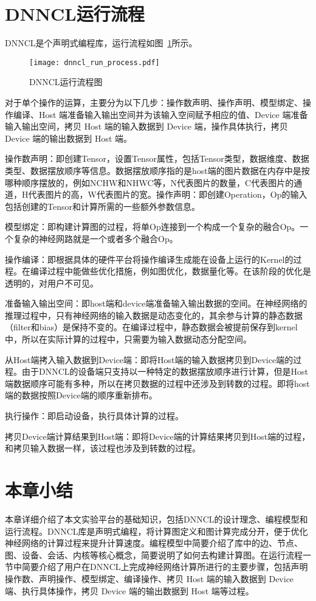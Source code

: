 \section{DNNCL运行流程}
DNNCL是个声明式编程库，运行流程如图~\ref{fig:dnncl-run-process}所示。

\begin{figure}[htb]
  \centering
  \texttt{[image: dnncl\_run\_process.pdf]}
  \caption{DNNCL运行流程图}
  \label{fig:dnncl-run-process}
\end{figure}

对于单个操作的运算，主要分为以下几步：操作数声明、操作声明、模型绑定、操作编译、Host 端准备输入输出空间并为该输入空间赋予相应的值、Device 端准备输入输出空间，拷贝 Host 端的输入数据到 Device 端，操作具体执行，拷贝 Device 端的输出数据到 Host 端。

操作数声明：即创建Tensor，设置Tensor属性，包括Tensor类型，数据维度、数据类型、数据摆放顺序等信息。数据摆放顺序指的是host端的图片数据在内存中是按哪种顺序摆放的，例如NCHW和NHWC等，N代表图片的数量，C代表图片的通道，H代表图片的高，W代表图片的宽。操作声明：即创建Operation，Op的输入包括创建的Tensor和计算所需的一些额外参数信息。

模型绑定：即构建计算图的过程，将单Op连接到一个构成一个复杂的融合Op。一个复杂的神经网路就是一个或者多个融合Op。

操作编译：即根据具体的硬件平台将操作编译生成能在设备上运行的Kernel的过程。在编译过程中能做些优化措施，例如图优化，数据量化等。在该阶段的优化是透明的，对用户不可见。

准备输入输出空间：即host端和device端准备输入输出数据的空间。在神经网络的推理过程中，只有神经网络的输入数据是动态变化的，其余参与计算的静态数据（filter和bias）是保持不变的。在编译过程中，静态数据会被提前保存到kernel中，所以在实际计算的过程中，只需要为输入数据动态分配空间。

从Host端拷入输入数据到Device端：即将Host端的输入数据拷贝到Device端的过程。由于DNNCL的设备端只支持以一种特定的数据摆放顺序进行计算，但是Host端数据顺序可能有多种，所以在拷贝数据的过程中还涉及到转数的过程。即将host端的数据按照Device端的顺序重新排布。

执行操作：即启动设备，执行具体计算的过程。

拷贝Device端计算结果到Host端：即将Device端的计算结果拷贝到Host端的过程，和拷贝输入数据一样，该过程也涉及到转数的过程。

\section {本章小结}
本章详细介绍了本文实验平台的基础知识，包括DNNCL的设计理念、编程模型和运行流程。DNNCL库是声明式编程，将计算图定义和图计算完成分开，便于优化神经网络的计算过程来提升计算速度。编程模型中简要介绍了库中的边、节点、图、设备、会话、内核等核心概念，简要说明了如何去构建计算图。在运行流程一节中简要介绍了用户在DNNCL上完成神经网络计算所进行的主要步骤，包括声明操作数、声明操作、模型绑定、编译操作、拷贝 Host 端的输入数据到 Device 端、执行具体操作，拷贝 Device 端的输出数据到 Host 端等过程。
